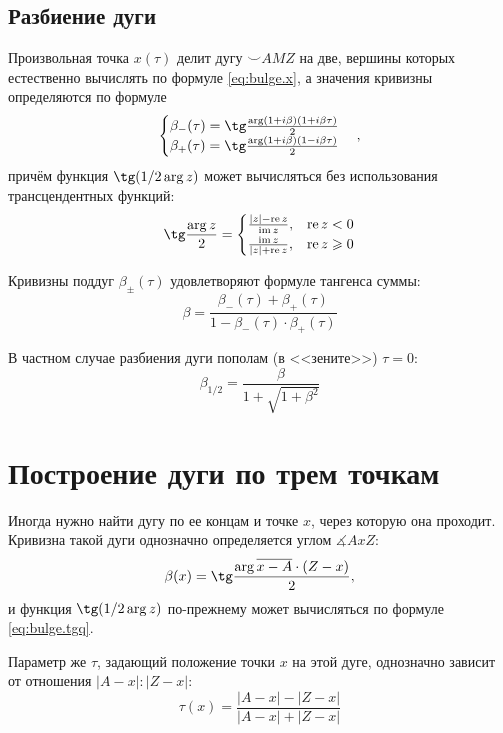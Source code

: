 \subsection*{Разбиение дуги}

Произвольная точка
$x(\tau)$
делит дугу
${\smile}AMZ$
на две,
вершины которых естественно вычислять по формуле
\eqref{eq:bulge.x},
а значения кривизны определяются по формуле
$$
\begin{cases}
  \beta_{-}(\tau)= \tg \frac{\arg (1+i\beta)(1+i\beta\tau)}2
  \\
  \beta_{+}(\tau)= \tg \frac{\arg (1+i\beta)(1-i\beta\tau)}2
  \end{cases}
  ,
$$
причём функция
$\tg(1/2\arg z)$
может вычисляться без использования
трансцендентных функций:
\begin{equation}
  \label{eq:bulge.tgq}
  \tg \frac{\arg z}2 =
  \begin{cases}
    \frac{|z|-\operatorname{re} z}{\operatorname{im} z}, & \operatorname{re} z < 0
    \\
    \frac{\operatorname{im} z}{|z|+\operatorname{re} z}, & \operatorname{re} z \geqslant 0
  \end{cases}
\end{equation}

Кривизны поддуг
$\beta_{\pm}(\tau)$
удовлетворяют формуле тангенса суммы:
$$
\beta = \frac{\beta_{-}(\tau)+\beta_{+}(\tau)}{1-\beta_{-}(\tau)\cdot\beta_{+}(\tau)}
$$

В частном случае разбиения дуги пополам
(в <<зените>>)
$\tau=0$:
$$
\beta_{1/2}=
  \frac{\beta}{1+\sqrt{1+\beta^2}}
$$

\section*{Построение дуги по трем точкам}

Иногда нужно найти дугу по ее концам и точке $x$,
через которую она проходит.
Кривизна такой дуги однозначно определяется
углом $\measuredangle AxZ$:
$$
\beta(x) =
  \tg \frac{\arg \overline{x - A} \cdot \left(Z- x \right)}{2}
  ,
$$
и функция
$\tg(1/2\arg z)$
по-прежнему может вычисляться по формуле~
\eqref{eq:bulge.tgq}.

Параметр же
$\tau$,
задающий положение точки $x$
на этой дуге,
однозначно зависит от отношения
$|A-x|:|Z-x|$:
$$
\tau(x) =
  \frac{|A-x|-|Z-x|}{|A-x|+|Z-x|}
$$
